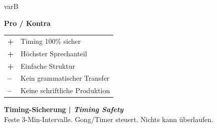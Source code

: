 \documentclass[11pt, a4paper]{article}
\newcommand{\en}[1]{{\small\color{english}\textit{#1}}}
\newcommand{\pro}{\textcolor{success}{\textbf{+}}}
\newcommand{\kontra}{\textcolor{spanisch}{\textbf{--}}}
\newcommand{\risikoniedrig}{\colorbox{success!20}{\textcolor{success}{\scriptsize\textbf{NIEDRIG}}}}
\newcommand{\score}[1]{\colorbox{spanisch!15}{\textcolor{spanisch}{\textbf{#1/10}}}}
\begin{document}
\begin{varbox}[title={\textcolor{varB}{VARIANTE B: Speed-Dating} \hfill \score{8.7} \risikoniedrig}]{varB}
\begin{minipage}[t]{0.48\textwidth}
\vspace{0.3cm}

\textbf{Pro / Kontra}\\[0.1cm]
\begin{tabular}{ll}
\pro & Timing 100\% sicher \\
\pro & Höchster Sprechanteil \\
\pro & Einfache Struktur \\
\kontra & Kein grammatischer Transfer \\
\kontra & Keine schriftliche Produktion \\
\end{tabular}

\vspace{0.2cm}

\textbf{Timing-Sicherung | \en{Timing Safety}}\\[0.1cm]
Feste 3-Min-Intervalle. Gong/Timer steuert. Nichts kann überlaufen.
\end{minipage}

\end{varbox}

\vspace{0.4cm}

\end{document}
